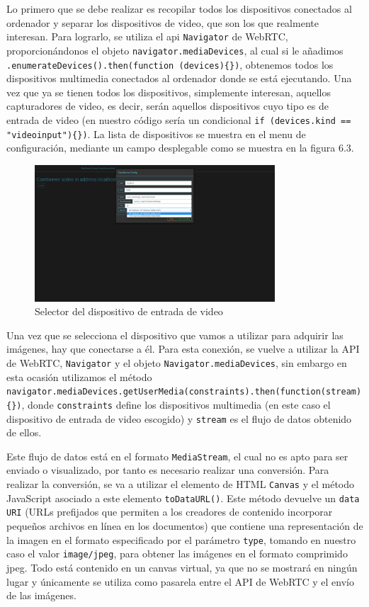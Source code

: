 Lo primero que se debe realizar es recopilar todos los dispositivos conectados al ordenador y separar los dispositivos de video, que son los que realmente interesan. Para lograrlo, se utiliza el api \texttt{Navigator} de WebRTC, proporcionándonos el objeto \texttt{navigator.mediaDevices}, al cual si le añadimos \texttt{.enumerateDevices().then(function (devices)\{\})}, obtenemos todos los dispositivos multimedia conectados al ordenador donde se está ejecutando. Una vez que ya se tienen todos los dispositivos, simplemente interesan, aquellos capturadores de video, es decir, serán aquellos dispositivos cuyo tipo es de entrada de video (en nuestro código sería un condicional \texttt{if (devices.kind == "videoinput")\{\})}. La lista de dispositivos se muestra en el menu de configuración, mediante un campo desplegable como se muestra en la figura 6.3.
 \begin{figure}[H]
  \begin{center}
    \includegraphics[width=0.8\textwidth]{figures/devicecamserver.png}
		\caption{Selector del dispositivo de entrada de video}
		\label{fig.devicecamserver}
		\end{center}
\end{figure}
Una vez que se selecciona el dispositivo que vamos a utilizar para adquirir las imágenes, hay que conectarse a él. Para esta conexión, se vuelve a utilizar la API de WebRTC, \texttt{Navigator} y el objeto \texttt{Navigator.mediaDevices}, sin embargo en esta ocasión utilizamos el método \texttt{navigator.mediaDevices.getUserMedia(constraints).then(function(stream) \{\})}, donde \texttt{constraints} define los dispositivos multimedia (en este caso el dispositivo de entrada de video escogido) y \texttt{stream} es el flujo de datos obtenido de ellos.

Este flujo de datos está en el formato \texttt{MediaStream}, el cual no es apto para ser enviado o visualizado, por tanto es necesario realizar una conversión. Para realizar la conversión, se va a utilizar el elemento de HTML \texttt{Canvas} y el método JavaScript asociado a este elemento \texttt{toDataURL()}. Este método devuelve un \texttt{data URI} (URLs prefijados que permiten a los creadores de contenido incorporar pequeños archivos en línea en los documentos) que contiene una representación de la imagen en el formato especificado por el parámetro \texttt{type}, tomando en nuestro caso el valor \texttt{image/jpeg}, para obtener las imágenes en el formato comprimido jpeg. Todo está contenido en un canvas virtual, ya que no se mostrará en ningún lugar y únicamente se utiliza como pasarela entre el API de WebRTC y el envío de las imágenes.

